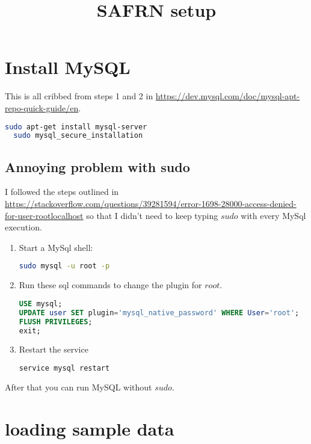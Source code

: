 \documentclass[12pt]{article}
\begin{document}
\lstset{language=sh}
\lstset{language=sql}
\lstset{language=xml}


\title{SAFRN setup}


\section{Install MySQL}

This is all cribbed from steps 1 and 2 in \url{https://dev.mysql.com/doc/mysql-apt-repo-quick-guide/en}.


\begin{lstlisting}[language=sh]
  sudo apt-get install mysql-server
  sudo mysql_secure_installation
\end{lstlisting}

\subsection{Annoying problem with sudo}

I followed the steps outlined in
\url{https://stackoverflow.com/questions/39281594/error-1698-28000-access-denied-for-user-rootlocalhost}
so that I didn't need to keep typing $sudo$ with every MySql
execution.

\begin{enumerate}
\item Start a MySql shell:
\begin{lstlisting}[language=sh]
sudo mysql -u root -p
\end{lstlisting}

\item Run these sql commands to change the plugin for $root$.
\begin{lstlisting}[language=sql]
USE mysql;
UPDATE user SET plugin='mysql_native_password' WHERE User='root';
FLUSH PRIVILEGES;
exit;
\end{lstlisting}

\item Restart the service
\begin{lstlisting}[language=sh]
service mysql restart
\end{lstlisting}
\end{enumerate}

After that you can run MySQL without $sudo$.

\section{loading sample data}
\end{document}
